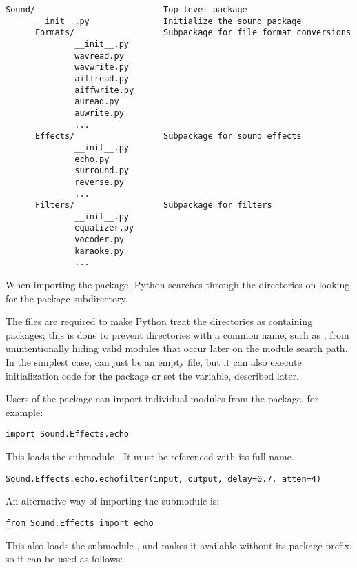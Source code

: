 \documentclass{manual}
\begin{document}
\begin{verbatim}
Sound/                          Top-level package
      __init__.py               Initialize the sound package
      Formats/                  Subpackage for file format conversions
              __init__.py
              wavread.py
              wavwrite.py
              aiffread.py
              aiffwrite.py
              auread.py
              auwrite.py
              ...
      Effects/                  Subpackage for sound effects
              __init__.py
              echo.py
              surround.py
              reverse.py
              ...
      Filters/                  Subpackage for filters
              __init__.py
              equalizer.py
              vocoder.py
              karaoke.py
              ...
\end{verbatim}

When importing the package, Python searches through the directories
on  looking for the package subdirectory.

The  files are required to make Python treat the
directories as containing packages; this is done to prevent
directories with a common name, such as , from
unintentionally hiding valid modules that occur later on the module
search path. In the simplest case,  can just be an
empty file, but it can also execute initialization code for the
package or set the  variable, described later.

Users of the package can import individual modules from the
package, for example:

\begin{verbatim}
import Sound.Effects.echo
\end{verbatim}

This loads the submodule .  It must be referenced
with its full name.

\begin{verbatim}
Sound.Effects.echo.echofilter(input, output, delay=0.7, atten=4)
\end{verbatim}

An alternative way of importing the submodule is:

\begin{verbatim}
from Sound.Effects import echo
\end{verbatim}

This also loads the submodule , and makes it available without
its package prefix, so it can be used as follows:
\end{document}
